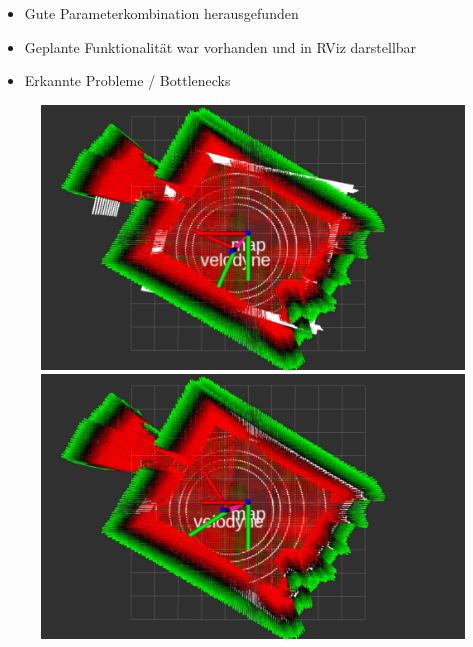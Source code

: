 \documentclass{beamer}
\begin{document}
\begin{frame}{\subsecname}
\begin{itemize}
\item Gute Parameterkombination herausgefunden
\item Geplante Funktionalität war vorhanden und in RViz darstellbar
\item Erkannte Probleme / Bottlenecks
\end{itemize}
\begin{figure}
    \includegraphics[width=\linewidth]{images/demo1.jpg}
\endminipage\hfill
{}
    \includegraphics[width=\linewidth]{images/demo2.jpg}
\endminipage\hfill
\end{figure}
\end{frame}
\end{document}
